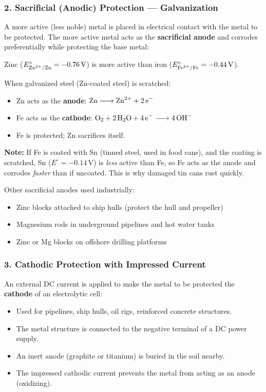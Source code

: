 \subsubsection{2. Sacrificial (Anodic) Protection --- Galvanization}

A more active (less noble) metal is placed in electrical contact with the metal to be protected. The more active metal acts as the \textbf{sacrificial anode} and corrodes preferentially while protecting the base metal:

\begin{conceptbox}
Zinc ($E^\circ_{\ce{Zn^2+/Zn}} = -0.76\,\text{V}$) is more active than iron ($E^\circ_{\ce{Fe^2+/Fe}} = -0.44\,\text{V}$).

When galvanized steel (Zn-coated steel) is scratched:
\begin{itemize}
    \item Zn acts as the \textbf{anode}: $\ce{Zn -> Zn^2+ + 2e-}$
    \item Fe acts as the \textbf{cathode}: $\ce{O2 + 2H2O + 4e- -> 4OH-}$
    \item Fe is protected; Zn sacrifices itself.
\end{itemize}
\textbf{Note:} If Fe is coated with Sn (tinned steel, used in food cans), and the coating is scratched, Sn ($E^\circ = -0.14\,\text{V}$) is \textit{less} active than Fe, so Fe acts as the anode and corrodes \textit{faster} than if uncoated. This is why damaged tin cans rust quickly.
\end{conceptbox}

Other sacrificial anodes used industrially:
\begin{itemize}
    \item Zinc blocks attached to ship hulls (protect the hull and propeller)
    \item Magnesium rods in underground pipelines and hot water tanks
    \item Zinc or Mg blocks on offshore drilling platforms
\end{itemize}

\subsubsection{3. Cathodic Protection with Impressed Current}

An external DC current is applied to make the metal to be protected the \textbf{cathode} of an electrolytic cell:
\begin{itemize}
    \item Used for pipelines, ship hulls, oil rigs, reinforced concrete structures.
    \item The metal structure is connected to the negative terminal of a DC power supply.
    \item An inert anode (graphite or titanium) is buried in the soil nearby.
    \item The impressed cathodic current prevents the metal from acting as an anode (oxidizing).
\end{itemize}

